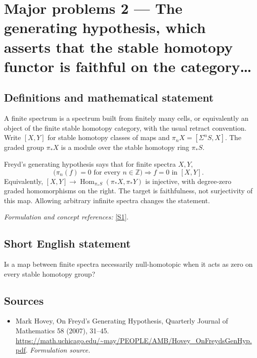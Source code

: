 \documentclass[11pt]{article}
\begin{document}
\section*{\texorpdfstring{Major problems 2 — The generating hypothesis, which asserts that the stable homotopy functor is faithful on the category…}{Major problems 2 — The generating hypothesis, which asserts that the stable homotopy functor is faithful on the category…}}\label{11100002}
\subsection{Definitions and mathematical statement}
A finite spectrum is a spectrum built from finitely many cells, or equivalently an object of the finite stable homotopy category, with the usual retract convention. Write $[X,Y]$ for stable homotopy classes of maps and $\pi_nX=[\Sigma^nS,X]$. The graded group $\pi_*X$ is a module over the stable homotopy ring $\pi_*S$.

Freyd's generating hypothesis says that for finite spectra $X,Y$,
\[
 \bigl(\pi_n(f)=0\text{ for every }n\in{\mathbb{Z}}\bigr)
                  \Longrightarrow f=0\text{ in }[X,Y].
\]
Equivalently, $[X,Y]\to\operatorname{Hom}_{\pi_*S}(\pi_*X,\pi_*Y)$ is injective, with degree-zero graded homomorphisms on the right. The target is faithfulness, not surjectivity of this map. Allowing arbitrary infinite spectra changes the statement.
\par\smallskip\textit{Formulation and concept references:} \href{https://math.uchicago.edu/~may/PEOPLE/AMB/Hovey_OnFreydsGenHyp.pdf}{[S1]}.

\subsection{Short English statement}
Is a map between finite spectra necessarily null-homotopic when it acts as zero on every stable homotopy group?
\subsection{Sources}
\begin{itemize}
\item[S1]Mark Hovey, On Freyd's Generating Hypothesis, Quarterly Journal of Mathematics 58 (2007), 31–45.
\url{https://math.uchicago.edu/~may/PEOPLE/AMB/Hovey_OnFreydsGenHyp.pdf}.
\textit{Formulation source.}
\end{itemize}
\end{document}
